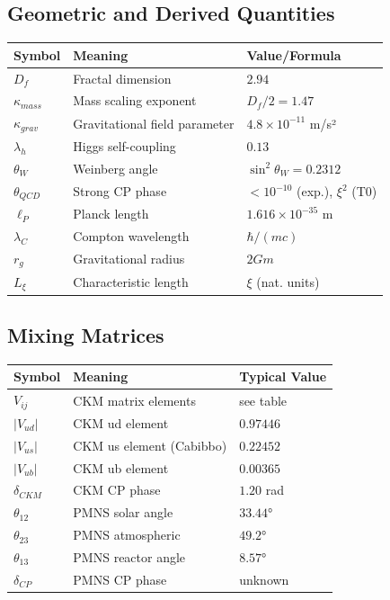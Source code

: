 \subsection{Geometric and Derived Quantities}
\begin{longtable}{lll}
	\toprule
	\textbf{Symbol} & \textbf{Meaning} & \textbf{Value/Formula} \\
	\midrule
	$D_f$ & Fractal dimension & $2.94$ \\
	$\kappa_{mass}$ & Mass scaling exponent & $D_f/2 = 1.47$ \\
	$\kappa_{grav}$ & Gravitational field parameter & $4.8 \times 10^{-11}$ m/s² \\
	$\lambda_h$ & Higgs self-coupling & $0.13$ \\
	$\theta_W$ & Weinberg angle & $\sin^2\theta_W = 0.2312$ \\
	$\theta_{QCD}$ & Strong CP phase & $< 10^{-10}$ (exp.), $\xi^2$ (T0) \\
	$\ell_P$ & Planck length & $1.616 \times 10^{-35}$ m \\
	$\lambda_C$ & Compton wavelength & $\hbar/(mc)$ \\
	$r_g$ & Gravitational radius & $2Gm$ \\
	$L_\xi$ & Characteristic length & $\xi$ (nat. units) \\
	\bottomrule
\end{longtable}
\normalsize

\subsection{Mixing Matrices}
\begin{longtable}{lll}
	\toprule
	\textbf{Symbol} & \textbf{Meaning} & \textbf{Typical Value} \\
	\midrule
	$V_{ij}$ & CKM matrix elements & see table \\
	$|V_{ud}|$ & CKM ud element & $0.97446$ \\
	$|V_{us}|$ & CKM us element (Cabibbo) & $0.22452$ \\
	$|V_{ub}|$ & CKM ub element & $0.00365$ \\
	$\delta_{CKM}$ & CKM CP phase & $1.20$ rad \\
	$\theta_{12}$ & PMNS solar angle & $33.44°$ \\
	$\theta_{23}$ & PMNS atmospheric & $49.2°$ \\
	$\theta_{13}$ & PMNS reactor angle & $8.57°$ \\
	$\delta_{CP}$ & PMNS CP phase & unknown \\
	\bottomrule
\end{longtable}
\normalsize

